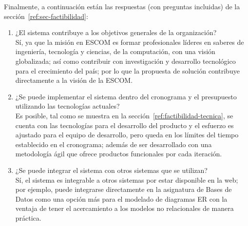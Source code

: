 Finalmente, a continuación están las respuestas (con preguntas incluidas) de la sección~\ref{ref:sec-factibilidad}:


\begin{enumerate}
    \item ¿El sistema contribuye a los objetivos generales de la organización?\\ Sí, ya que la misión en ESCOM es formar profesionales líderes en saberes de ingeniería, tecnología y ciencias, de la computación, con una visión globalizada; así como contribuir con investigación y desarrollo tecnológico para el crecimiento del país; por lo que la propuesta de solución contribuye directamente a la visión de la ESCOM.
    \item ¿Se puede implementar el sistema dentro del cronograma y el presupuesto utilizando las tecnologías actuales? \\Es posible, tal como se muestra en la sección~\ref{ref:factibilidad-tecnica}, se cuenta con las tecnologías para el desarrollo del producto y el esfuerzo es ajustado para el equipo de desarrollo, pero queda en los límites del tiempo establecido en el cronograma; además de ser desarrollado con una metodología ágil que ofrece productos funcionales por cada iteración.
    \item ¿Se puede integrar el sistema con otros sistemas que se utilizan?\\ Sí, el sistema es integrable a otros sistemas por estar disponible en la web; por ejemplo, puede integrarse directamente en la asignatura de Bases de Datos como una opción más para el modelado de diagramas ER con la ventaja de tener el acercamiento a los modelos no relacionales de manera práctica.
\end{enumerate}